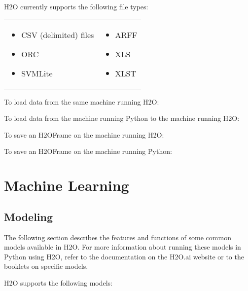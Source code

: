 { H2O currently supports the following file types:

\begin{frame}%

\begin{tabular}{p{5.5cm}p{5.5cm}}

\begin{itemize}
\item CSV (delimited) files
\item ORC
\item SVMLite
\end{itemize} &

\begin{itemize}
\item ARFF
\item XLS
\item XLST 
\end{itemize}

\end{tabular}
\end{frame}


To load data from the same machine running H2O:


To load data from the machine running Python to the machine running H2O:


To save an H2OFrame on the machine running H2O:


To save an H2OFrame on the machine running Python:


\newpage
\section{Machine Learning}

\subsection{Modeling}
The following section describes the features and functions of some common models available in H2O.  For more information about running these models in Python using H2O, refer to the documentation on
the H2O.ai website or to the booklets on specific models.


H2O supports the following models:  


}
